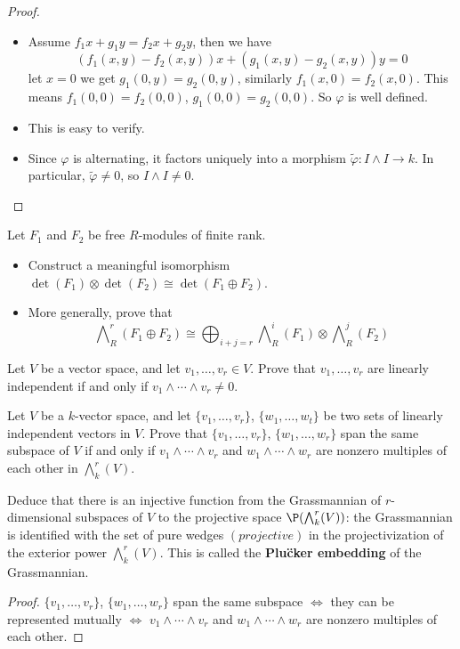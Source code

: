 \begin{proof}
\mbox{}
\begin{itemize}
\item Assume $f_1x+g_1y=f_2x+g_2y$, then we have
\[(f_1(x,y)-f_2(x,y))x+(g_1(x,y)-g_2(x,y))y=0\]
let $x=0$ we get $g_1(0,y)=g_2(0,y)$, similarly $f_1(x,0)=f_2(x,0)$. This means $f_1(0,0)=f_2(0,0)$, $g_1(0,0)=g_2(0,0)$. So $\varphi$ is well defined.
\item This is easy to verify.
\item Since $\varphi$ is alternating, it factors uniquely into a morphism $\widetilde{\varphi}:I\wedge I\to k$. In particular, $\widetilde{\varphi}\neq 0$, so $I\wedge I\neq 0$.
\end{itemize}
\end{proof}
\begin{exercise}
Let $F_1$ and $F_2$ be free $R$-modules of finite rank.
\begin{itemize}
\item Construct a meaningful isomorphism $\det(F_1)\otimes\det(F_2)\cong\det(F_1\oplus F_2)$.
\item More generally, prove that
\[\bigwedge\nolimits_R^r(F_1\oplus F_2)\cong\bigoplus_{i+j=r}\bigwedge\nolimits_R^i(F_1)\otimes\bigwedge\nolimits_R^j(F_2)\]
\end{itemize}
\end{exercise}
\begin{exercise}
Let $V$ be a vector space, and let $v_1,\dots,v_r\in V$. Prove that $v_1,\dots,v_r$ are linearly independent if and only if $v_1\wedge\cdots\wedge v_r\neq0$.
\end{exercise}
\begin{exercise}
Let $V$ be a $k$-vector space, and let $\{v_1,\dots,v_r\}$, $\{w_1,\dots,w_t\}$ be two sets of
linearly independent vectors in $V$. Prove that $\{v_1,\dots,v_r\}$, $\{w_1,\dots,w_r\}$ span the
same subspace of $V$ if and only if $v_1\wedge\cdots\wedge v_r$ and $w_1\wedge\cdots\wedge w_r$ are nonzero multiples of each other in $\bigwedge^r_k(V)$.\par
Deduce that there is an injective function from the Grassmannian of $r$-dimensional subspaces of $V$ to the projective space $\P(\bigwedge^r_k(V))$: the Grassmannian is identified with the set of pure wedges $(projective)$ in the projectivization of the exterior power $\bigwedge^r_k(V)$. This is called the \textbf{Plu\"cker embedding} of the Grassmannian.
\end{exercise}
\begin{proof}
$\{v_1,\dots,v_r\}$, $\{w_1,\dots,w_r\}$ span the same subspace $\iff$ they can be represented mutually $\iff$ $v_1\wedge\cdots\wedge v_r$ and $w_1\wedge\cdots\wedge w_r$ are nonzero multiples of each other.
\end{proof}
